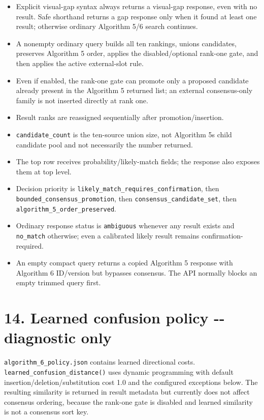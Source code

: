 \begin{itemize}
\tightlist
\item
  Explicit visual-gap syntax always returns a visual-gap response, even with no result. Safe shorthand returns a gap response only when it found at least one result; otherwise ordinary Algorithm 5/6 search continues.
\item
  A nonempty ordinary query builds all ten rankings, unions candidates, preserves Algorithm 5 order, applies the disabled/optional rank-one gate, and then applies the active external-slot rule.
\item
  Even if enabled, the rank-one gate can promote only a proposed candidate already present in the Algorithm 5 returned list; an external consensus-only family is not inserted directly at rank one.
\item
  Result ranks are reassigned sequentially after promotion/insertion.
\item
  \texttt{candidate\_\allowbreak{}count} is the ten-source union size, not Algorithm 5\textquotesingle s child candidate pool and not necessarily the number returned.
\item
  The top row receives probability/likely-match fields; the response also exposes them at top level.
\item
  Decision priority is \texttt{likely\_\allowbreak{}match\_\allowbreak{}requires\_\allowbreak{}confirmation}, then \texttt{bounded\_\allowbreak{}consensus\_\allowbreak{}promotion}, then \texttt{consensus\_\allowbreak{}candidate\_\allowbreak{}set}, then \texttt{algorithm\_\allowbreak{}5\_\allowbreak{}order\_\allowbreak{}preserved}.
\item
  Ordinary response status is \texttt{ambiguous} whenever any result exists and \texttt{no\_\allowbreak{}match} otherwise; even a calibrated likely result remains confirmation-required.
\item
  An empty compact query returns a copied Algorithm 5 response with Algorithm 6 ID/version but bypasses consensus. The API normally blocks an empty trimmed query first.
\end{itemize}

\section{14. Learned confusion policy -\/- diagnostic only}\label{14-learned-confusion-policy----diagnostic-only}

\texttt{algorithm\_\allowbreak{}6\_\allowbreak{}policy.json} contains learned directional costs. \texttt{learned\_\allowbreak{}confusion\_\allowbreak{}distance()} uses dynamic programming with default insertion/deletion/substitution cost 1.0 and the configured exceptions below. The resulting similarity is returned in result metadata but currently does not affect consensus ordering, because the rank-one gate is disabled and learned similarity is not a consensus sort key.

